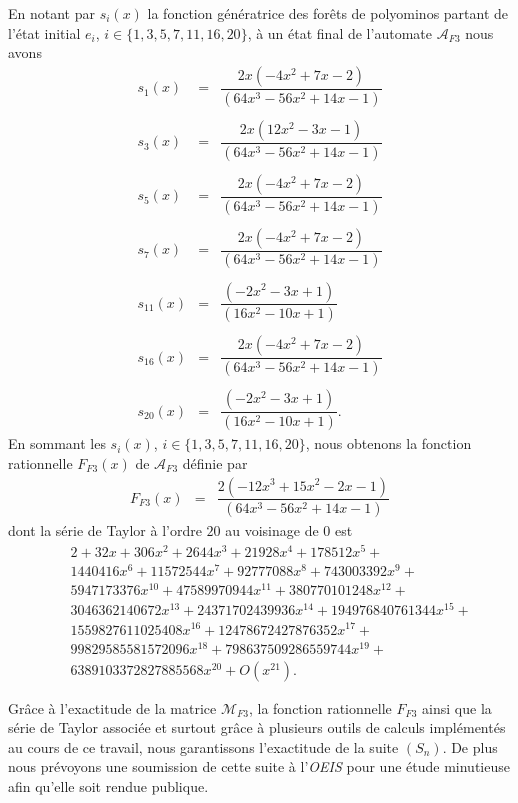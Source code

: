 En notant par $s_{i}(x)$ la fonction génératrice des forêts de polyominos partant de l'état initial $e_{i}$, $i\in \{1, 3, 5, 7, 11, 16, 20\}$, à un état final de l'automate $\mathcal{A}_{F3}$ nous avons
\begin{eqnarray*}
s_1(x)& = & \dfrac{2x(-4x^{2} + 7x - 2)}{(64x^{3} - 56x^{2} + 14x - 1)}\\
& &\\
s_3(x)& = & \dfrac{2x(12x^{2} - 3x - 1)}{(64x^{3} - 56x^{2} + 14x - 1)}\\
& &\\
s_5(x)& = & \dfrac{2x(-4x^{2} + 7x - 2)}{(64x^{3} - 56x^{2} + 14x - 1)}\\
& &\\
s_7(x)& = & \dfrac{2x(-4x^{2} + 7x - 2)}{(64x^{3} - 56x^{2} + 14x - 1)}\\
& &\\
s_{11}(x) & = & \dfrac{(-2x^{2} - 3x + 1)}{(16x^{2} - 10x + 1)}\\
& &\\
s_{16}(x) & = & \dfrac{2x(-4x^{2} + 7x - 2)}{(64x^{3} - 56x^{2} + 14x - 1)}\\
& &\\
s_{20}(x) & = & \dfrac{(-2x^{2} - 3x + 1)}{(16x^{2} - 10x + 1)}.
\end{eqnarray*}
En sommant les $s_{i}(x)$,  $i\in \{1, 3, 5, 7, 11, 16, 20\}$, nous obtenons la fonction rationnelle $F_{F3}(x)$ de $\mathcal{A}_{F3}$ définie par
\begin{eqnarray*}
F_{F3}(x) & = & \dfrac{2(-12x^{3} + 15x^{2} - 2x - 1)}{(64x^{3} - 56x^{2} + 14x - 1)}
\end{eqnarray*}
dont la série de Taylor à l'ordre $20$ au voisinage de $0$ est 
 \begin{eqnarray*}
& & 2+32x+306x^{2}+2644x^{3}+21928x^{4}+178512x^{5}+\\
& & 1440416x^{6}+11572544x^{7}+92777088x^{8}+743003392x^{9}+\\
 & & 5947173376x^{10}+47589970944x^{11}+380770101248x^{12}+\\
 & & 3046362140672x^{13}+24371702439936x^{14}+194976840761344x^{15}+\\
 & & 1559827611025408x^{16}+12478672427876352x^{17}+\\
 & & 99829585581572096x^{18}+798637509286559744x^{19}+\\
 & & 6389103372827885568x^{20}+O(x^{21}).
 \end{eqnarray*}



Grâce à l'exactitude de la matrice $\mathcal{M}_{F3}$, la fonction rationnelle $F_{F3}$ ainsi que la série de Taylor associée  et surtout grâce à plusieurs outils de calculs implémentés au cours de ce travail, nous garantissons l'exactitude de la suite $(S_{n})$. De plus nous prévoyons une soumission de cette suite à l'\emph{OEIS} pour une étude minutieuse afin qu'elle soit rendue publique.

